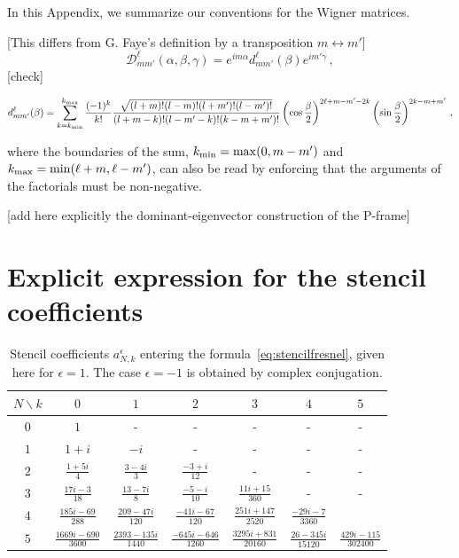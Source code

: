 \documentclass[aps,showpacs,twocolumn,
prd,superscriptaddress,nofootinbib]{revtex4-1}
\newcommand{\be}{\begin{equation}}
\newcommand{\ee}{\end{equation}}
\newcommand\calD{{\mathcal{D}}}
\newcommand{\SM}[1]{{\color{Red} #1}}
\begin{document}
In this Appendix, we summarize our conventions for the Wigner matrices.

\SM{[This differs from G. Faye's definition by a transposition $m\leftrightarrow m'$]}
\be\label{eq:defWignerDapp}
	\calD^{\ell}_{mm'} (\alpha, \beta, \gamma) = e^{im \alpha} d^{\ell}_{mm'}(\beta) e^{im' \gamma}\,,
\ee
\SM{[check]}
\begin{widetext}
\be\label{eq:defWignerdapp}
	d^{\ell}_{mm'}(\beta) = \sum\limits_{k=k_{\rm min}}^{k_{\rm max}} \frac{(-1)^{k}}{k!} \frac{\sqrt{(l+m)! (l-m)! (l+m')! (l-m')!}}{(l+m-k)! (l-m'-k)! (k-m+m')!} \left( \cos\frac{\beta}{2} \right)^{2\ell+m-m'-2k} \left( \sin\frac{\beta}{2} \right)^{2k-m+m'}\,,
\ee
\end{widetext}
where the boundaries of the sum, $k_{\rm min} = \mathrm{max}(0, m-m')$ and $k_{\rm max} = \mathrm{min}(\ell+m, \ell-m')$, can also be read by enforcing that the arguments of the factorials must be non-negative.

\SM{[add here explicitly the dominant-eigenvector construction of the P-frame]}

\section{Explicit expression for the stencil coefficients}
\label{app:stencil}

\begin{table}[t]
\begin{ruledtabular}\caption{Stencil coefficients $a_{N,k}^{\epsilon}$ entering the formula~\eqref{eq:stencilfresnel}, given here for $\epsilon=1$. The case $\epsilon=-1$ is obtained by complex conjugation.}\label{table:stencil}
\begin{tabular}{c|cccccc}
	$N \backslash k$ & $0$ & $1$ & $2$ & $3$ & $4$ & $5$ \\
	\hline
	$0$ & $1$ & - & - & - & - & - \\
	$1$ & $1+i$ & $-i$ & - & - & - & - \\
	$2$ & $\frac{1+5i}{4}$ & $\frac{3-4i}{3}$ & $\frac{-3+i}{12}$ & - & - & - \\
	$3$ & $\frac{17 i-3}{18}$ & $\frac{13-7 i}{8}$ & $\frac{-5-i}{10}$ & $\frac{11 i+15}{360}$ & - & - \\
	$4$ & $\frac{185 i-69}{288}$ & $\frac{209-47 i}{120}$ & $\frac{-41 i-67}{120}$ & $\frac{251 i+147}{2520}$ & $\frac{-29 i-7}{3360}$ & \\
	$5$ & $\frac{1669 i-690}{3600}$ & $\frac{2393-135 i}{1440}$ & $\frac{-645 i-646}{1260}$ & $\frac{3295 i+831}{20160}$ & $\frac{26-345 i}{15120}$ & $\frac{429 i-115}{302400}$ \\
\end{tabular}
\end{ruledtabular}
\end{table}
\end{document}
